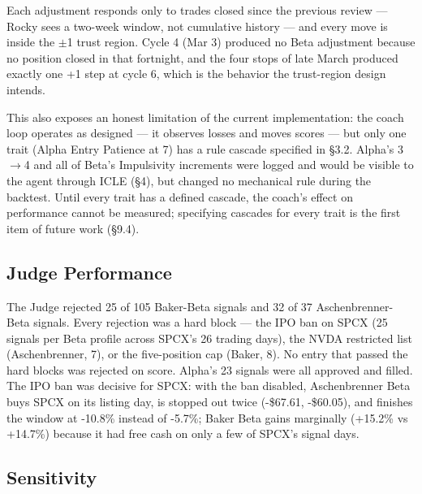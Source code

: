 \documentclass[11pt]{article}
\begin{document}
Each adjustment responds only to trades closed since the previous review --- Rocky sees a two-week window, not cumulative history --- and every move is inside the $\pm$1 trust region. Cycle 4 (Mar 3) produced no Beta adjustment because no position closed in that fortnight, and the four stops of late March produced exactly one +1 step at cycle 6, which is the behavior the trust-region design intends.

This also exposes an honest limitation of the current implementation: the coach loop operates as designed --- it observes losses and moves scores --- but only one trait (Alpha Entry Patience at 7) has a rule cascade specified in §3.2. Alpha's 3$\rightarrow$4 and all of Beta's Impulsivity increments were logged and would be visible to the agent through ICLE (§4), but changed no mechanical rule during the backtest. Until every trait has a defined cascade, the coach's effect on performance cannot be measured; specifying cascades for every trait is the first item of future work (§9.4).

\subsection{Judge Performance}\label{judge-performance}

The Judge rejected 25 of 105 Baker-Beta signals and 32 of 37 Aschenbrenner-Beta signals. Every rejection was a hard block --- the IPO ban on SPCX (25 signals per Beta profile across SPCX's 26 trading days), the NVDA restricted list (Aschenbrenner, 7), or the five-position cap (Baker, 8). No entry that passed the hard blocks was rejected on score. Alpha's 23 signals were all approved and filled. The IPO ban was decisive for SPCX: with the ban disabled, Aschenbrenner Beta buys SPCX on its listing day, is stopped out twice (-\$67.61, -\$60.05), and finishes the window at -10.8\% instead of -5.7\%; Baker Beta gains marginally (+15.2\% vs +14.7\%) because it had free cash on only a few of SPCX's signal days.

\subsection{Sensitivity}\label{sensitivity}
\end{document}
